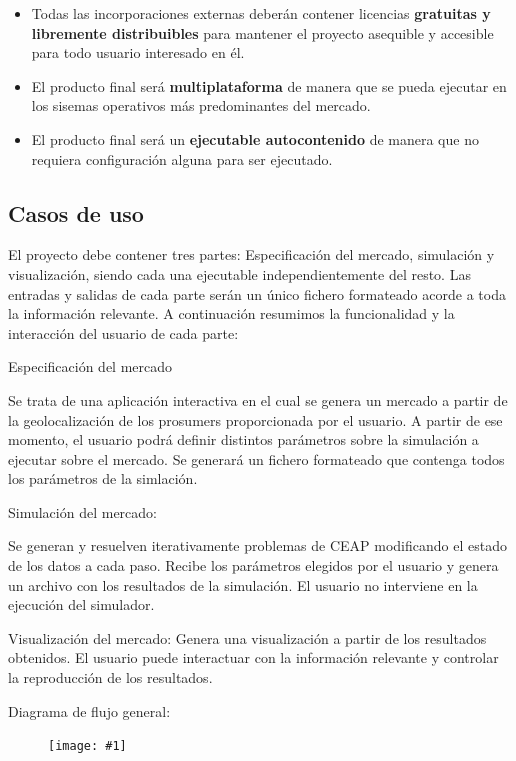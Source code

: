 \documentclass[12pt,a4paper,openright,oneside]{article}
\newcommand{\includeImage}[1]
{
	\begin{figure}[htb]
	\begin{center}
	\texttt{[image: \#1]}
	\end{center}
	\end{figure}
}
\numberwithin{equation}{section}
\theoremstyle{definition}
\begin{document}
\begin{itemize}
\begin{itemize}
\item Todas las incorporaciones externas deberán contener licencias \textbf{gratuitas y libremente distribuibles} para mantener el proyecto asequible y accesible para todo usuario interesado en él.

\item El producto final será \textbf{multiplataforma} de manera que se pueda ejecutar en los sisemas operativos más predominantes del mercado.

\item El producto final será un \textbf{ejecutable autocontenido} de manera que no requiera configuración alguna para ser ejecutado.

\end{itemize}
\end{itemize}
\subsection{Casos de uso}

El proyecto debe contener tres partes: Especificación del mercado, simulación y visualización, siendo cada una ejecutable independientemente del resto. Las entradas y salidas de cada parte serán un único fichero formateado acorde a toda la información relevante. A continuación resumimos la funcionalidad y la interacción del usuario de cada parte:

Especificación del mercado

Se trata de una aplicación interactiva en el cual se genera un mercado a partir de la geolocalización de los prosumers proporcionada por el usuario. A partir de ese momento, el usuario podrá definir distintos parámetros sobre la simulación a ejecutar sobre el mercado. Se generará un fichero formateado que contenga todos los parámetros de la simlación.

Simulación del mercado:

Se generan y resuelven iterativamente problemas de CEAP modificando el estado de los datos a cada paso.
Recibe los parámetros elegidos por el usuario y genera un archivo con los resultados de la simulación. El usuario no interviene en la ejecución del simulador.

Visualización del mercado:
Genera una visualización a partir de los resultados obtenidos. El usuario puede interactuar con la información relevante y controlar la reproducción de los resultados. 

Diagrama de flujo general:
\includeImage{flujos_principales.png}
\end{document}
